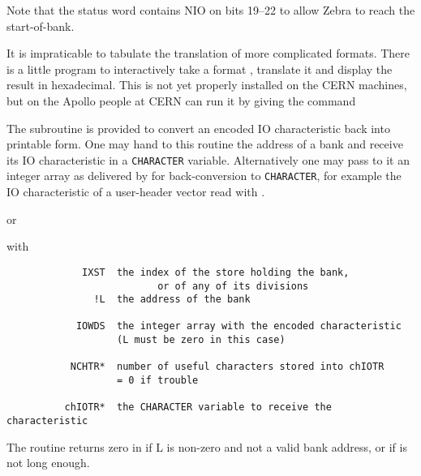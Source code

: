 Note that the status word contains NIO on bits 19--22
to allow Zebra to reach the start-of-bank.

It is impraticable to tabulate the translation of more
complicated formats. There is a little program 
to interactively take a format , translate it
and display the result in hexadecimal.
This is not yet properly installed on the CERN machines,
but on the Apollo people at CERN can run it by giving
the command 

The subroutine  is provided to convert an encoded
IO characteristic back into printable form.
One may hand to this routine the address of a bank and
receive its IO characteristic in a {\tt CHARACTER} variable.
Alternatively one may pass to it an integer array as delivered
by  for back-conversion to {\tt CHARACTER},
for example the IO characteristic of a user-header vector
read with .


or


with
\begin{verbatim}
             IXST  the index of the store holding the bank,
                          or of any of its divisions
               !L  the address of the bank

            IOWDS  the integer array with the encoded characteristic
                   (L must be zero in this case)

           NCHTR*  number of useful characters stored into chIOTR
                   = 0 if trouble

          chIOTR*  the CHARACTER variable to receive the characteristic
\end{verbatim}

The routine returns zero in  if L is non-zero and not
a valid bank address,
or if  is not long enough.
